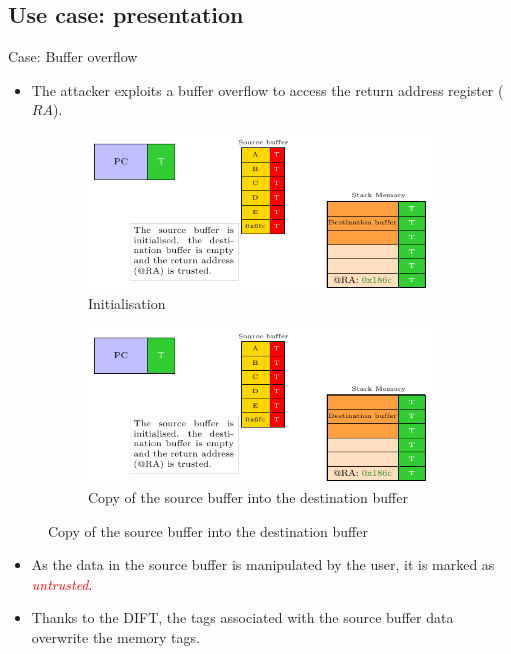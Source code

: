 \subsection{Use case: presentation}
\begin{frame}{Case: Buffer overflow}
    \begin{itemize}
        \item The attacker exploits a buffer overflow to access the return address register ($RA$).
    \end{itemize}

    \begin{figure}
        \centering
        \begin{subfigure}[l]{.45\textwidth}
            \centering
            \includegraphics[width=.9\textwidth, page=1]{src/2_vuln_assessment/img/buffer_overflow/schemaPedagogique.pdf}
            \caption{Initialisation}
            \label{fig:bo_1st_step}
        \end{subfigure}
        \begin{subfigure}[r]{.45\textwidth}
            \centering
            \includegraphics[width=.9\textwidth, page=2]{src/2_vuln_assessment/img/buffer_overflow/schemaPedagogique.pdf}
            \caption{Copy of the source buffer into the destination buffer}
            \label{fig:bo_2_step}
        \end{subfigure}
    \end{figure}

    \begin{itemize}
        \item As the data in the source buffer is manipulated by the user, it is marked as \textcolor{red}{\textit{untrusted}}.
        \item Thanks to the DIFT, the tags associated with the source buffer data overwrite the memory tags.
    \end{itemize}
\end{frame}

